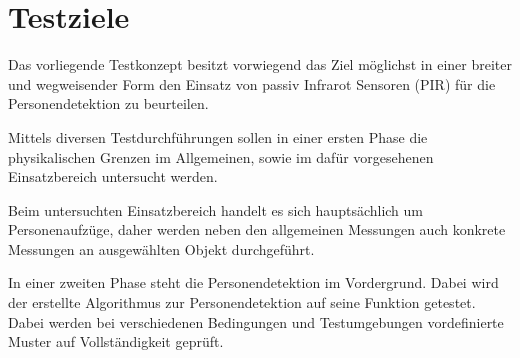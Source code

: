\chapter{Testziele}

Das vorliegende Testkonzept besitzt vorwiegend das Ziel möglichst in einer breiter und wegweisender Form den Einsatz von passiv Infrarot Sensoren (PIR) für die Personendetektion zu beurteilen. 

Mittels diversen Testdurchführungen sollen in einer ersten Phase die physikalischen Grenzen im Allgemeinen, sowie im dafür vorgesehenen Einsatzbereich untersucht werden. 

Beim untersuchten Einsatzbereich handelt es sich hauptsächlich um Personenaufzüge, daher werden neben den allgemeinen Messungen auch konkrete Messungen an ausgewählten Objekt durchgeführt.  

In einer zweiten Phase steht die Personendetektion im Vordergrund. Dabei wird der erstellte Algorithmus zur Personendetektion auf seine Funktion getestet. Dabei werden bei verschiedenen Bedingungen und Testumgebungen vordefinierte Muster auf Vollständigkeit geprüft.
